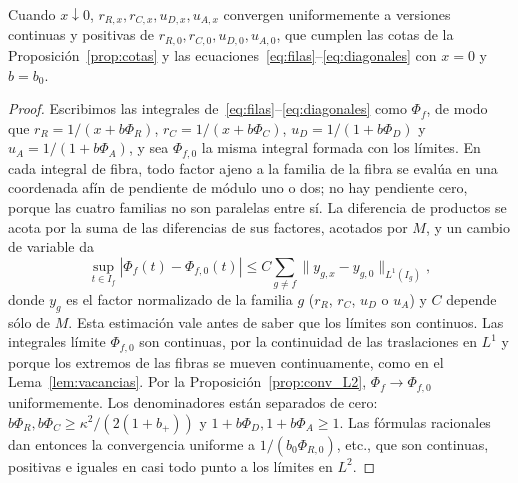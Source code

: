 \begin{proposicion}\label{prop:conv_unif}
Cuando $x\downarrow0$, $r_{R,x},r_{C,x},u_{D,x},u_{A,x}$ convergen uniformemente a versiones continuas
y positivas de $r_{R,0},r_{C,0},u_{D,0},u_{A,0}$, que cumplen las cotas de la
Proposición~\ref{prop:cotas} y las ecuaciones~\eqref{eq:filas}--\eqref{eq:diagonales} con $x=0$ y $b=b_0$.
\end{proposicion}

\begin{proof}
Escribimos las integrales de~\eqref{eq:filas}--\eqref{eq:diagonales} como $\Phi_f$, de modo que
$r_R=1/(x+b\Phi_R)$, $r_C=1/(x+b\Phi_C)$, $u_D=1/(1+b\Phi_D)$ y $u_A=1/(1+b\Phi_A)$, y sea $\Phi_{f,0}$
la misma integral formada con los límites. En cada integral de fibra, todo factor ajeno a la familia
de la fibra se evalúa en una coordenada afín de pendiente de módulo uno o dos; no hay pendiente cero,
porque las cuatro familias no son paralelas entre sí. La diferencia de productos se acota por la suma
de las diferencias de sus factores, acotados por $M$, y un cambio de variable da
\begin{equation}\label{eq:fibras_unif}
 \sup_{t\in I_f}|\Phi_f(t)-\Phi_{f,0}(t)|\le C\sum_{g\ne f}\|y_{g,x}-y_{g,0}\|_{L^1(I_g)},
\end{equation}
donde $y_g$ es el factor normalizado de la familia $g$ ($r_R$, $r_C$, $u_D$ o $u_A$) y $C$ depende sólo
de $M$. Esta estimación vale antes de saber que los límites son continuos. Las integrales límite
$\Phi_{f,0}$ son continuas, por la continuidad de las traslaciones en $L^1$ y porque los extremos de las
fibras se mueven continuamente, como en el Lema~\ref{lem:vacancias}. Por la
Proposición~\ref{prop:conv_L2}, $\Phi_f\to\Phi_{f,0}$ uniformemente. Los denominadores están separados
de cero: $b\Phi_R,b\Phi_C\ge\kappa^2/(2(1+b_+))$ y $1+b\Phi_D,1+b\Phi_A\ge1$. Las fórmulas racionales
dan entonces la convergencia uniforme a $1/(b_0\Phi_{R,0})$, etc., que son continuas, positivas e
iguales en casi todo punto a los límites en $L^2$.
\end{proof}

